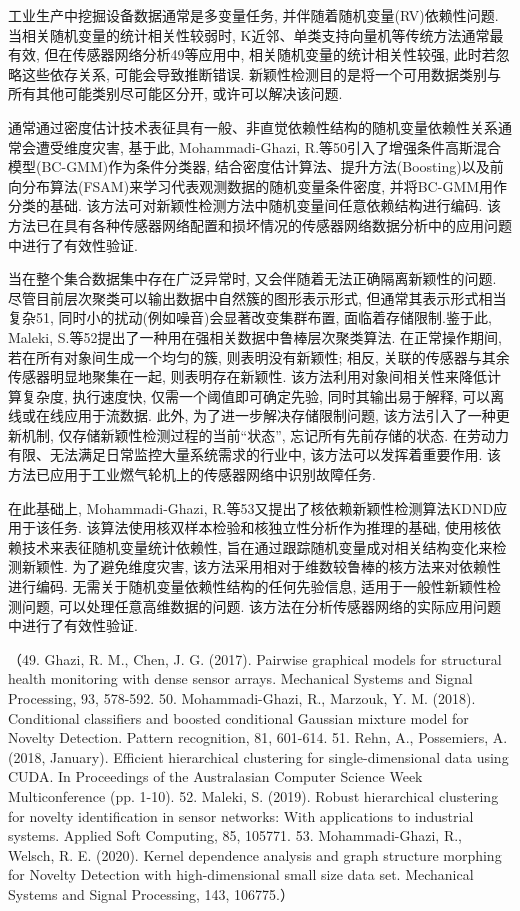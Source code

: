 \documentclass{Style/aas}
\begin{document}
\begin{multicols}{2}
  工业生产中挖掘设备数据通常是多变量任务, 并伴随着随机变量(RV)依赖性问题. 当相关随机变量的统计相关性较弱时, K近邻、单类支持向量机等传统方法通常最有效, 但在传感器网络分析49等应用中, 相关随机变量的统计相关性较强, 此时若忽略这些依存关系, 可能会导致推断错误. 新颖性检测目的是将一个可用数据类别与所有其他可能类别尽可能区分开, 或许可以解决该问题.

  通常通过密度估计技术表征具有一般、非直觉依赖性结构的随机变量依赖性关系通常会遭受维度灾害, 基于此, Mohammadi-Ghazi, R.等50引入了增强条件高斯混合模型(BC-GMM)作为条件分类器, 结合密度估计算法、提升方法(Boosting)以及前向分布算法(FSAM)来学习代表观测数据的随机变量条件密度, 并将BC-GMM用作分类的基础. 该方法可对新颖性检测方法中随机变量间任意依赖结构进行编码. 该方法已在具有各种传感器网络配置和损坏情况的传感器网络数据分析中的应用问题中进行了有效性验证.

  当在整个集合数据集中存在广泛异常时, 又会伴随着无法正确隔离新颖性的问题. 尽管目前层次聚类可以输出数据中自然簇的图形表示形式, 但通常其表示形式相当复杂51, 同时小的扰动(例如噪音)会显著改变集群布置, 面临着存储限制.鉴于此, Maleki, S.等52提出了一种用在强相关数据中鲁棒层次聚类算法. 在正常操作期间, 若在所有对象间生成一个均匀的簇, 则表明没有新颖性; 相反, 关联的传感器与其余传感器明显地聚集在一起, 则表明存在新颖性. 该方法利用对象间相关性来降低计算复杂度, 执行速度快, 仅需一个阈值即可确定先验, 同时其输出易于解释, 可以离线或在线应用于流数据. 此外, 为了进一步解决存储限制问题, 该方法引入了一种更新机制, 仅存储新颖性检测过程的当前“状态”, 忘记所有先前存储的状态. 在劳动力有限、无法满足日常监控大量系统需求的行业中, 该方法可以发挥着重要作用. 该方法已应用于工业燃气轮机上的传感器网络中识别故障任务.

  在此基础上, Mohammadi-Ghazi, R.等53又提出了核依赖新颖性检测算法KDND应用于该任务. 该算法使用核双样本检验和核独立性分析作为推理的基础, 使用核依赖技术来表征随机变量统计依赖性, 旨在通过跟踪随机变量成对相关结构变化来检测新颖性. 为了避免维度灾害, 该方法采用相对于维数较鲁棒的核方法来对依赖性进行编码. 无需关于随机变量依赖性结构的任何先验信息, 适用于一般性新颖性检测问题, 可以处理任意高维数据的问题. 该方法在分析传感器网络的实际应用问题中进行了有效性验证.

  （49.	Ghazi, R. M., Chen, J. G. (2017). Pairwise graphical models for structural health monitoring with dense sensor arrays. Mechanical Systems and Signal Processing, 93, 578-592.
  50.	Mohammadi-Ghazi, R., Marzouk, Y. M. (2018). Conditional classifiers and boosted conditional Gaussian mixture model for Novelty Detection. Pattern recognition, 81, 601-614.
  51.	Rehn, A., Possemiers, A. (2018, January). Efficient hierarchical clustering for single-dimensional data using CUDA. In Proceedings of the Australasian Computer Science Week Multiconference (pp. 1-10).
  52.	Maleki, S. (2019). Robust hierarchical clustering for novelty identification in sensor networks: With applications to industrial systems. Applied Soft Computing, 85, 105771.
  53.	Mohammadi-Ghazi, R., Welsch, R. E. (2020). Kernel dependence analysis and graph structure morphing for Novelty Detection with high-dimensional small size data set. Mechanical Systems and Signal Processing, 143, 106775.）


\end{multicols}
\end{document}
